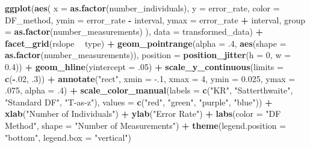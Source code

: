 \documentclass[12pt, twoside]{amherstthesis}
\newenvironment{Shaded}{\begin{snugshade}}{\end{snugshade}}
\newcommand{\DataTypeTok}[1]{\textcolor[rgb]{0.13,0.29,0.53}{#1}}
\newcommand{\DecValTok}[1]{\textcolor[rgb]{0.00,0.00,0.81}{#1}}
\newcommand{\FloatTok}[1]{\textcolor[rgb]{0.00,0.00,0.81}{#1}}
\newcommand{\KeywordTok}[1]{\textcolor[rgb]{0.13,0.29,0.53}{\textbf{#1}}}
\newcommand{\NormalTok}[1]{#1}
\newcommand{\OperatorTok}[1]{\textcolor[rgb]{0.81,0.36,0.00}{\textbf{#1}}}
\newcommand{\StringTok}[1]{\textcolor[rgb]{0.31,0.60,0.02}{#1}}
\begin{document}
\begin{Shaded}
\begin{Highlighting}[]
{{{{{{{{{{\KeywordTok{ggplot}\NormalTok{(}\KeywordTok{aes}\NormalTok{(}
  \DataTypeTok{x =} \KeywordTok{as.factor}\NormalTok{(number_individuals), }\DataTypeTok{y =}\NormalTok{ error_rate, }\DataTypeTok{color =}\NormalTok{ DF_method,}
  \DataTypeTok{ymin =}\NormalTok{ error_rate }\OperatorTok{-}\StringTok{ }\NormalTok{interval, }\DataTypeTok{ymax =}\NormalTok{ error_rate }\OperatorTok{+}\StringTok{ }\NormalTok{interval,}
  \DataTypeTok{group =} \KeywordTok{as.factor}\NormalTok{(number_measurements)}
\NormalTok{), }\DataTypeTok{data =}\NormalTok{ transformed_data) }\OperatorTok{+}
\StringTok{  }\KeywordTok{facet_grid}\NormalTok{(rslope }\OperatorTok{~}\StringTok{ }\NormalTok{type) }\OperatorTok{+}
\StringTok{  }\KeywordTok{geom_pointrange}\NormalTok{(}\DataTypeTok{alpha =} \FloatTok{.4}\NormalTok{, }\KeywordTok{aes}\NormalTok{(}\DataTypeTok{shape =} \KeywordTok{as.factor}\NormalTok{(number_measurements)), }
                  \DataTypeTok{position =} \KeywordTok{position_jitter}\NormalTok{(}\DataTypeTok{h =} \DecValTok{0}\NormalTok{, }\DataTypeTok{w =} \FloatTok{0.4}\NormalTok{)) }\OperatorTok{+}
\StringTok{  }\KeywordTok{geom_hline}\NormalTok{(}\DataTypeTok{yintercept =} \FloatTok{.05}\NormalTok{) }\OperatorTok{+}
\StringTok{  }\KeywordTok{scale_y_continuous}\NormalTok{(}\DataTypeTok{limits =} \KeywordTok{c}\NormalTok{(}\OperatorTok{-}\NormalTok{.}\DecValTok{02}\NormalTok{, }\FloatTok{.3}\NormalTok{)) }\OperatorTok{+}
\StringTok{  }\KeywordTok{annotate}\NormalTok{(}\StringTok{"rect"}\NormalTok{, }\DataTypeTok{xmin =} \FloatTok{-.1}\NormalTok{, }\DataTypeTok{xmax =} \DecValTok{4}\NormalTok{, }\DataTypeTok{ymin =} \FloatTok{0.025}\NormalTok{, }\DataTypeTok{ymax =} \FloatTok{.075}\NormalTok{, }
           \DataTypeTok{alpha =} \FloatTok{.4}\NormalTok{) }\OperatorTok{+}
\StringTok{  }\KeywordTok{scale_color_manual}\NormalTok{(}\DataTypeTok{labels =} \KeywordTok{c}\NormalTok{(}\StringTok{"KR"}\NormalTok{, }\StringTok{"Satterthwaite"}\NormalTok{, }\StringTok{"Standard DF"}\NormalTok{, }\StringTok{"T-as-z"}\NormalTok{), }
                     \DataTypeTok{values =} \KeywordTok{c}\NormalTok{(}\StringTok{"red"}\NormalTok{, }\StringTok{"green"}\NormalTok{, }\StringTok{"purple"}\NormalTok{, }\StringTok{"blue"}\NormalTok{)) }\OperatorTok{+}
\StringTok{  }\KeywordTok{xlab}\NormalTok{(}\StringTok{"Number of Individuals"}\NormalTok{) }\OperatorTok{+}
\StringTok{  }\KeywordTok{ylab}\NormalTok{(}\StringTok{"Error Rate"}\NormalTok{) }\OperatorTok{+}
\StringTok{  }\KeywordTok{labs}\NormalTok{(}\DataTypeTok{color =} \StringTok{"DF Method"}\NormalTok{, }\DataTypeTok{shape =} \StringTok{"Number of Measurements"}\NormalTok{) }\OperatorTok{+}
\StringTok{  }\KeywordTok{theme}\NormalTok{(}\DataTypeTok{legend.position =} \StringTok{"bottom"}\NormalTok{, }\DataTypeTok{legend.box =} \StringTok{"vertical"}\NormalTok{)}


}}}}}}}}}}
\end{Highlighting}
\end{Shaded}
\end{document}
